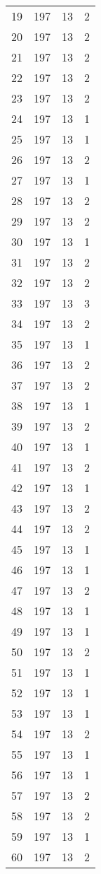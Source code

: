 \begin{longtable}[!]{c|ccc}
	19	& 197	& 13	& 2	\\
	20	& 197	& 13	& 2	\\
	21	& 197	& 13	& 2	\\
	22	& 197	& 13	& 2	\\
	23	& 197	& 13	& 2	\\
	24	& 197	& 13	& 1	\\
	25	& 197	& 13	& 1	\\
	26	& 197	& 13	& 2	\\
	27	& 197	& 13	& 1	\\
	28	& 197	& 13	& 2	\\
	29	& 197	& 13	& 2	\\
	30	& 197	& 13	& 1	\\
	31	& 197	& 13	& 2	\\
	32	& 197	& 13	& 2	\\
	33	& 197	& 13	& 3	\\
	34	& 197	& 13	& 2	\\
	35	& 197	& 13	& 1	\\
	36	& 197	& 13	& 2	\\
	37	& 197	& 13	& 2	\\
	38	& 197	& 13	& 1	\\
	39	& 197	& 13	& 2	\\
	40	& 197	& 13	& 1	\\
	41	& 197	& 13	& 2	\\
	42	& 197	& 13	& 1	\\
	43	& 197	& 13	& 2	\\
	44	& 197	& 13	& 2	\\
	45	& 197	& 13	& 1	\\
	46	& 197	& 13	& 1	\\
	47	& 197	& 13	& 2	\\
	48	& 197	& 13	& 1	\\
	49	& 197	& 13	& 1	\\
	50	& 197	& 13	& 2	\\
	51	& 197	& 13	& 1	\\
	52	& 197	& 13	& 1	\\
	53	& 197	& 13	& 1	\\
	54	& 197	& 13	& 2	\\
	55	& 197	& 13	& 1	\\
	56	& 197	& 13	& 1	\\
	57	& 197	& 13	& 2	\\
	58	& 197	& 13	& 2	\\
	59	& 197	& 13	& 1	\\
	60	& 197	& 13	& 2	\\

\end{longtable}

